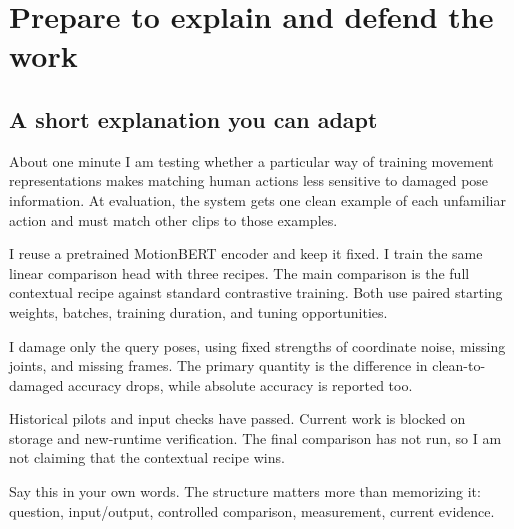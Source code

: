 \clearpage
\section{Prepare to explain and defend the work}\label{sec:explain}
\subsection{A short explanation you can adapt}
\begin{concept}{About one minute}
I am testing whether a particular way of training movement representations
makes matching human actions less sensitive to damaged pose information.
At evaluation, the system gets one clean example of each unfamiliar action
and must match other clips to those examples.

I reuse a pretrained MotionBERT encoder and keep it fixed. I train the same
linear comparison head with three recipes. The main comparison is the full
contextual recipe against standard contrastive training. Both use paired
starting weights, batches, training duration, and tuning opportunities.

I damage only the query poses, using fixed strengths of coordinate noise,
missing joints, and missing frames. The primary quantity is the difference
in clean-to-damaged accuracy drops, while absolute accuracy is reported too.

Historical pilots and input checks have passed. Current work is blocked on
storage and new-runtime verification. The final comparison has not run, so I
am not claiming that the contextual recipe wins.
\end{concept}

Say this in your own words. The structure matters more than memorizing it:
question, input/output, controlled comparison, measurement, current evidence.


